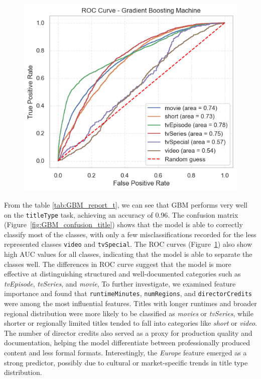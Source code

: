 \begin{figure}[ht]
\begin{minipage}{0.4\textwidth}
    \label{fig:GBM_confusion_title} 
    \end{minipage}
    \begin{minipage}{0.4\textwidth} 
    \centering
    \includegraphics[width=\textwidth]{plotsss/GBM_ROC_title.png} 
    \label{fig:GBM_ROC_title} 
    \end{minipage}

    \end{figure}

From the table \ref{tab:GBM_report_t}, we can see that GBM performs very well on the \texttt{titleType} task, achieving an accuracy of 0.96.
The confusion matrix (Figure~\ref{fig:GBM_confusion_title}) shows that the model is able to correctly classify most of the classes, 
with only a few misclassifications recorded for the less represented classes \texttt{video} and \texttt{tvSpecial}.
The ROC curves (Figure~\ref{fig:GBM_ROC_title}) also show high AUC values for all classes, 
indicating that the model is able to separate the classes well.
The differences in ROC curve suggest that the model is more effective at distinguishing structured and well-documented 
categories such as \textit{tvEpisode}, \textit{tvSeries}, and \textit{movie}, 
To further investigate, we examined feature importance and found that \texttt{runtimeMinutes}, \texttt{numRegions}, 
and \texttt{directorCredits} were among the most influential features. 
Titles with longer runtimes and broader regional distribution were more likely to be classified as \textit{movies} or \textit{tvSeries}, 
while shorter or regionally limited titles tended to fall into categories like \textit{short} or \textit{video}. 
The number of director credits also served as a proxy for production quality and documentation, 
helping the model differentiate between professionally produced content and less formal formats. 
Interestingly, the \textit{Europe} feature emerged as a strong predictor, 
possibly due to cultural or market-specific trends in title type distribution. 


